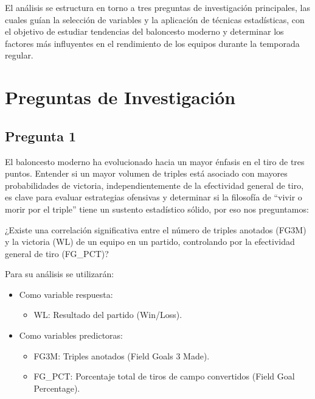 \documentclass[12pt]{article}
\begin{document}
El análisis se estructura en torno a tres preguntas de investigación principales, las cuales guían la selección de variables y la aplicación de técnicas estadísticas, con el objetivo de estudiar tendencias del baloncesto moderno y determinar los factores más influyentes en el rendimiento de los equipos durante la temporada regular.


\section*{Preguntas de Investigación}
\label{sec:preguntas}

\subsection*{Pregunta 1}
\label{subsec:pregunta1}

\vspace{0.3cm}

El baloncesto moderno ha evolucionado hacia un mayor énfasis en el tiro de tres puntos. Entender si un mayor volumen de triples está asociado con mayores probabilidades de victoria, independientemente de la efectividad general de tiro, es clave para evaluar estrategias ofensivas y determinar si la filosofía de ``vivir o morir por el triple'' tiene un sustento estadístico sólido, por eso nos preguntamos:

\vspace{0.3cm}
¿Existe una correlación significativa entre el número de triples anotados (FG3M) y la victoria (WL) de un equipo en un partido, controlando por la efectividad general de tiro (FG\_PCT)?


Para su análisis se utilizarán:
\begin{itemize}[label={}]
    \setlength\itemsep{0.1em}
    \item Como variable respuesta:
    \begin{itemize}[label={}]
        \item WL: Resultado del partido (Win/Loss).
    \end{itemize}
    \item Como variables predictoras:
    \begin{itemize}[label={}]
        \item FG3M: Triples anotados (Field Goals 3 Made).
        \item FG\_PCT: Porcentaje total de tiros de campo convertidos (Field Goal Percentage).
    \end{itemize}
\end{itemize}
\end{document}
